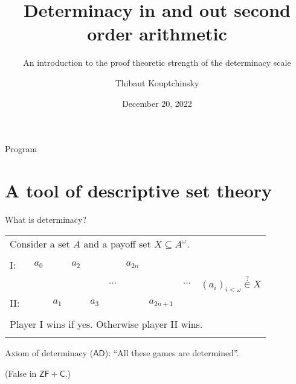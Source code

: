 \documentclass{beamer} %
\title[Determinacy axioms]{Determinacy in and out second order arithmetic}
\subtitle[]{An introduction to the proof theoretic strength of the determinacy scale}
\institute[Proof Theory Conference]{Proof Theory Conference \and UCLouvain}
\author{Thibaut Kouptchinsky}
\date{December 20, 2022}
\begin{document}
\begin{frame}
	\titlepage
\end{frame}


\begin{frame}{Program}
    \tableofcontents
\end{frame}

\section{A tool of descriptive set theory}

\begin{frame}{What is determinacy?}
    
    \begin{tabular}{llllllllll}
        \multicolumn{10}{l}{Consider a set $A$ and a payoff set $X \subseteq A^{\omega}$.}\\
        &&&&&&&&&\\
        I:\ & $a_0$ &       & $a_2$ &       &          &$a_{2n}$   &           & & \\
            &       &       &       &       & $\cdots$ &           &           & $\cdots$ & \qquad ${(a_i)}_{i < \omega} \overset{?}{\in} X$\\
        II:\ &       & $a_1$ &       & $a_3$ &          &           &$a_{2n+1}$ & & \\
        &&&&&&&&&\\
        \multicolumn{10}{l}{Player I wins if yes. Otherwise player II wins.} \\ 
        &&&&&&&&&\\
    \end{tabular}

    Axiom of determinacy ($\mathsf{AD}$): ``All these games are determined''.
    
    (False in $\mathsf{ZF + C}$.)
\end{frame}

\end{document}
